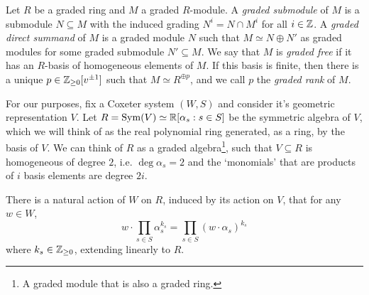\begin{definition}
    Let $R$ be a graded ring and $M$ a graded $R$-module. A \textit{graded submodule} of $M$ is a submodule $N \subseteq M$ with the induced grading $N^i = N \cap M^i$ for all $i \in \mathbb{Z}$. A \textit{graded direct summand} of $M$ is a graded module $N$ such that $M \simeq N \oplus N'$ as graded modules for some graded submodule $N' \subseteq M$.
    We say that $M$ is \textit{graded free} if it has an $R$-basis of homogeneous elements of $M$. If this basis is finite, then there is a unique $p \in \mathbb{Z}_{\geq 0}[v^{\pm 1}]$ such that $M \simeq R^{\oplus p}$, and we call $p$ the \textit{graded rank} of $M$.
\end{definition}


For our purposes, fix a Coxeter system $(W,S)$ and consider it's geometric representation $V$. Let $R = \operatorname{Sym}(V) \simeq \mathbb{R}[\alpha_s : s \in S]$ be the symmetric algebra of $V$, which we will think of as the real polynomial ring generated, as a ring, by the basis of $V$. We can think of $R$ as a graded algebra\footnote{A graded module that is also a graded ring.}, such that $V \subseteq R$ is homogeneous of degree $2$, i.e. $\deg \alpha_s = 2$ and the `monomials' that are products of $i$ basis elements are degree $2i$.

There is a natural action of $W$ on $R$, induced by its action on $V$, that for any $w \in W$,
\[
    w \cdot \prod_{s \in S} \alpha_s^{k_s} = \prod_{s \in S} (w \cdot \alpha_s)^{k_s}
\]
where $k_s \in \mathbb{Z}_{\geq 0}$, extending linearly to $R$.





